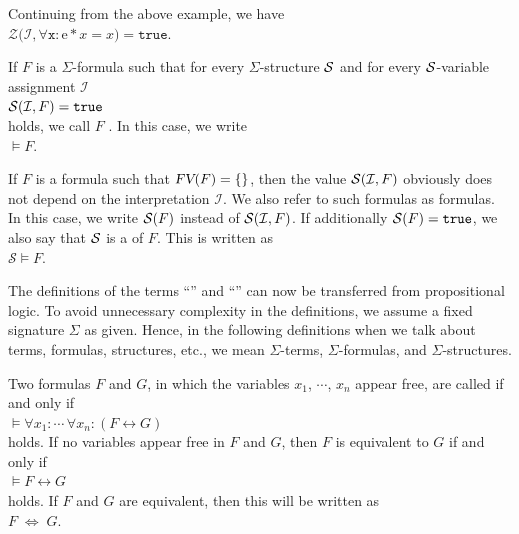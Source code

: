 \exampleEng
Continuing from the above example, we have \\[0.2cm]
\hspace*{1.3cm}  $\mathcal{Z}\bigl(\mathcal{I}, \forall \mathtt{x}: \mathrm{e} * x = x \bigr) = \mathtt{true}$.
\eox

\begin{Definition} 
    If $F$ is a $\Sigma$-formula such that for every $\Sigma$-structure $\mathcal{S}$ and for every
    $\mathcal{S}$-variable assignment $\mathcal{I}$ \\[0.2cm]
    \hspace*{1.3cm} $\mathcal{S}(\mathcal{I}, F) = \mathtt{true}$ \\[0.2cm]
    holds, we call $F$ . In this case, we write \\[0.2cm]
    \hspace*{1.3cm} $\models F$. 
    \eox
\end{Definition}

If $F$ is a formula such that $\textsl{FV}(F) = \{\}$, then the value $\mathcal{S}(\mathcal{I}, F)$ 
obviously does not depend on the interpretation $\mathcal{I}$. We also refer to such formulas as 
 formulas. In this case, we write $\mathcal{S}(F)$
instead of $\mathcal{S}(\mathcal{I}, F)$. If additionally $\mathcal{S}(F) = \mathtt{true}$, 
we also say that $\mathcal{S}$ is a   of $F$.
This is written as \\[0.2cm]
\hspace*{1.3cm} $\mathcal{S} \models F$. 
\vspace{0.1cm}

The definitions of the terms ``'' and
``'' can now be transferred from propositional logic. 
To avoid unnecessary complexity in the definitions, we assume a
fixed signature $\Sigma$ as given. Hence, in the following definitions
when we talk about terms, formulas, structures, etc., we mean $\Sigma$-terms,
$\Sigma$-formulas, and $\Sigma$-structures.

\begin{Definition}[Equivalent] 
  Two formulas $F$ and $G$, in which the variables $x_1$, $\cdots$, $x_n$ appear free, are called
   if and only if  
  \\[0.2cm] 
  \hspace*{1.3cm}
  $\models \forall x_1: \cdots\, \forall x_n: (F \leftrightarrow G)$
  \\[0.2cm] 
  holds. If no variables appear free in $F$ and $G$, then $F$ is equivalent to $G$ if and only if
  \\[0.2cm]
  \hspace*{1.3cm}
  $\models F \leftrightarrow G$
  \\[0.2cm]
  holds.  If $F$ and $G$ are equivalent, then this will be written as
  \\[0.2cm]
  \hspace*{1.3cm}
  $F \;\Leftrightarrow\; G$.
  \eox
\end{Definition}

